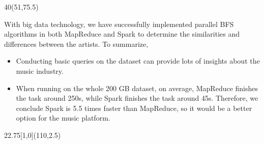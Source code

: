 \documentclass[hyperref={pdfpagelabels=false}]{beamer}
\begin{document}
\begin{frame}
\begin{textblock}{40}(51,75.5)
	\begin{basebox}[title=Conclusion, opacitybacktitle=.45,colbacktitle=green!10, colframe=green!65!black, halign title=left]
 With big data technology, we have successfully implemented parallel BFS algorithms in both MapReduce and Spark to determine the similarities and differences between the artists. To summarize, 
 \begin{itemize}
\item Conducting basic queries on the dataset can provide lots of insights about the music industry.
\item When running on the whole 200 GB dataset, on average, MapReduce finishes the task around 250s, while Spark finishes the task around 45s. Therefore, we conclude Spark is 5.5 times faster than MapReduce, so it would be a better option for the music platform. 
\end{itemize}
	\end{basebox}
\end{textblock}

%
%

\begin{textblock}{22.75}[1,0](110,2.5)
	\logos[light]
\end{textblock}

\end{frame}
\end{document}
